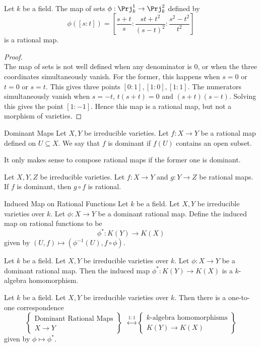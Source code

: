 \documentclass[a4paper]{article}
\begin{document}
\begin{eg}{}{}\\
Let $k$ be a field. The map of sets $\phi:\Prj_k^1\to\Prj_k^2$ defined by $$\phi([s:t])=\left[\frac{s+t}{s}:\frac{st+t^2}{(s-t)^2}:\frac{s^2-t^2}{t^2}\right]$$ is a rational map. 
\begin{proof}\\
The map of sets is not well defined when any denominator is $0$, or when the three coordinates simultaneously vanish. For the former, this happens when $s=0$ or $t=0$ or $s=t$. This gives three points $[0:1],[1:0],[1:1]$. The numerators simultaneously vanish when $s=-t$, $t(s+t)=0$ and $(s+t)(s-t)$. Solving this gives the point $[1:-1]$. Hence this map is a rational map, but not a morphism of varieties. 
\end{proof}
\end{eg}

\begin{defn}{Dominant Maps}{} Let $X,Y$ be irreducible varieties. Let $f:X\to Y$ be a rational map defined on $U\subseteq X$. We say that $f$ is dominant if $f(U)$ contains an open subset. 
\end{defn}

It only makes sense to compose rational maps if the former one is dominant. 

\begin{prp}{}{} Let $X,Y,Z$ be irreducible varieties. Let $f:X\to Y$ and $g:Y\to Z$ be rational maps. If $f$ is dominant, then $g\circ f$ is rational. 
\end{prp}

\begin{defn}{Induced Map on Rational Functions}{} Let $k$ be a field. Let $X,Y$ be irreducible varieties over $k$. Let $\phi:X\to Y$ be a dominant rational map. Define the induced map on rational functions to be $$\phi^\ast:K(Y)\to K(X)$$ given by $(U,f)\mapsto (\phi^{-1}(U),f\circ\phi)$. 
\end{defn}

\begin{prp}{}{} Let $k$ be a field. Let $X,Y$ be irreducible varieties over $k$. Let $\phi:X\to Y$ be a dominant rational map. Then the induced map $\phi^\ast:K(Y)\to K(X)$ is a $k$-algebra homomorphism. 
\end{prp}

\begin{prp}{}{} Let $k$ be a field. Let $X,Y$ be irreducible varieties over $k$. Then there is a one-to-one correspondence $$\left\{\substack{\text{Dominant Rational Maps}\\X\to Y}\right\}\;\;\overset{1:1}{\longleftrightarrow}\left\{\substack{k\text{-algebra homomorphisms}\\K(Y)\to K(X)}\right\}$$ given by $\phi\mapsto\phi^\ast$. 
\end{prp}
\end{document}
